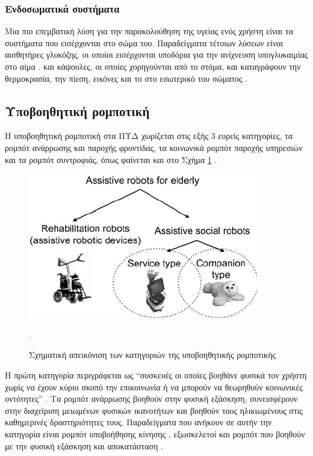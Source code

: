 \subsubsection{Ενδοσωματικά συστήματα}
Μια πιο επεμβατική λύση για την παρακολούθηση της υγείας ενός χρήστη είναι τα συστήματα που εισέρχονται στο σώμα του.
Παραδείγματα τέτοιων λύσεων είναι αισθητήρες γλυκόζης, οι οποίοι εισέρχονται υποδόρια για την ανίχνευση υπογλυκαιμίας στο αίμα \cite{Juhl2010}.
και κάψουλες, οι οποίες χορηγούνται από το στόμα, και καταγράφουν την θερμοκρασία, την πίεση, εικόνες και το  στο εσωτερικό του σώματος \cite{McCaffrey2008}.
\subsection{Υποβοηθητική ρομποτική}
Η υποβοηθητική ρομποτική στα ΠΥΔ χωρίζεται στις εξής 3 ευρείς κατηγορίες, τα ρομπότ ανάρρωσης και παροχής φροντίδας, τα κοινωνικά ρομπότ παροχής υπηρεσιών και τα ρομπότ συντροφιάς, όπως φαίνεται και στο Σχήμα \ref{robot_start} \cite{Broekens2009}\cite{Robinson2014}.
\begin{figure}[h!]
\centering
\includegraphics[scale=0.6]{images/robotics_start.png}
\caption{Σχηματική απεικόνιση των κατηγοριών της υποβοηθητικής ρομποτικής}.
\label{robot_start}
\end{figure}
Η πρώτη κατηγορία περιγράφεται ως ``συσκευές οι οποίες βοηθάνε φυσικά τον χρήστη χωρίς να έχουν κύριο σκοπό την επικοινωνία ή να μπορούν να θεωρηθούν κοινωνικές οντότητες'' \cite{Robinson2014}.
Τα ρομπότ ανάρρωσης βοηθούν στην φυσική εξάσκηση, συνεισφέρουν στην διαχείριση μειωμένων φυσικών
ικανοτήτων και βοηθούν τους ηλικιωμένους στις καθημερινές δραστηριότητες τους.
Παραδείγματα που ανήκουν σε αυτήν την κατηγορία είναι ρομπότ υποβοήθησης κίνησης \cite{Spenko2006}, εξωσκελετοί \cite{OSullivan2015} και ρομπότ που βοηθούν με την φυσική εξάσκηση και αποκατάσταση \cite{Johnson2006}.
\par
